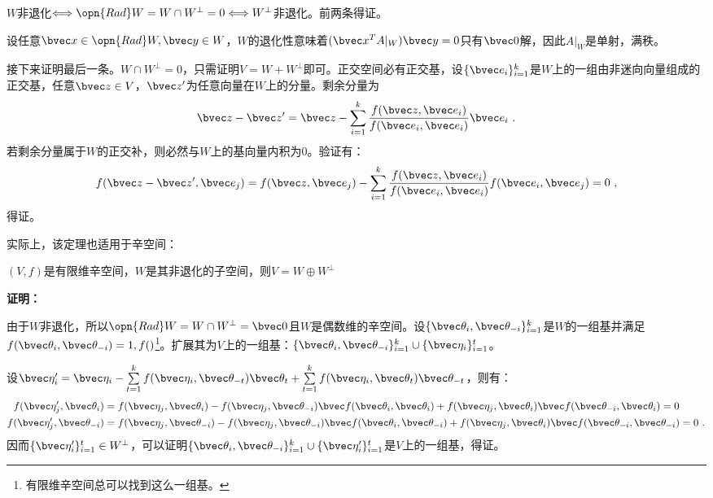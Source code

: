 $W$非退化$\Longleftrightarrow \opn{Rad}W=W\cap W^{\bot}=0\Longleftrightarrow  W^{\bot}$非退化。前两条得证。

设任意$\bvec x\in \opn{Rad} W,\bvec y\in W$，$W$的退化性意味着$(\bvec x^{T}A|_{W})\bvec  y=0$只有$\bvec 0$解，因此$A|_{W}$是单射，满秩。

接下来证明最后一条。$W\cap W^{\bot}=0$，只需证明$V=W+W^{\bot}$即可。正交空间必有正交基，设$\{\bvec e_i\}_{i=1}^k$是$W$上的一组由非迷向向量组成的正交基，任意$\bvec z\in V$，$\bvec z'$为任意向量在$W$上的分量。剩余分量为
\begin{equation}
\bvec z-\bvec z'=\bvec z-\sum\limits_{i=1}^k\frac{f(\bvec z,\bvec e_i)}{f(\bvec e_i,\bvec e_i)}\bvec e_i~.
\end{equation}
若剩余分量属于$W$的正交补，则必然与$W$上的基向量内积为$0$。验证有：
\begin{equation}
f(\bvec z-\bvec z',\bvec e_j)=f(\bvec z,\bvec e_j)-\sum\limits_{i=1}^k\frac{f(\bvec z,\bvec e_i)}{f(\bvec e_i,\bvec e_i)}f(\bvec e_i,\bvec e_j)=0~,
\end{equation}
得证。

实际上，该定理也适用于辛空间：
\begin{theorem}{}
$(V,f)$是有限维辛空间，$W$是其非退化的子空间，则$V=W\oplus W^{\bot}$
\end{theorem}
\textbf{证明：}

由于$W$非退化，所以$\opn{Rad} W=W\cap W^{\bot}={\bvec 0}$且$W$是偶数维的辛空间。设$\{\bvec \theta_i,\bvec \theta_{-i}\}_{i=1}^k$是$W$的一组基并满足$f(\bvec \theta_i,\bvec\theta_{-i})=1,f()$\footnote{有限维辛空间总可以找到这么一组基。}。扩展其为$V$上的一组基：$\{\bvec \theta_i,\bvec \theta_{-i}\}_{i=1}^k\cup\{\bvec \eta_i\}_{i=1}^{t}$。

设$\bvec \eta'_i=\bvec\eta_i-\sum\limits_{t=1}^kf(\bvec \eta_i,\bvec \theta_{-t})\bvec\theta_t+\sum\limits_{t=1}^kf(\bvec\eta_i,\bvec\theta_t)\bvec\theta_{-t}$，则有：
\begin{equation}
\begin{aligned}
f(\bvec \eta'_j,\bvec  \theta_i)&=f(\bvec \eta_j,\bvec  \theta_i)-f(\bvec\eta_j,\bvec  \theta_{-i})\bvec f(\bvec \theta_i,\bvec \theta_i)+f(\bvec\eta_j,\bvec \theta_i)\bvec f(\bvec \theta_{-i},\bvec \theta_{i})=0\\
f(\bvec \eta'_j,\bvec  \theta_{-i})&=f(\bvec \eta_j,\bvec  \theta_{-i})-f(\bvec\eta_j,\bvec  \theta_{-i})\bvec f(\bvec \theta_i,\bvec \theta_{-i})+f(\bvec\eta_j,\bvec \theta_i)\bvec f(\bvec \theta_{-i},\bvec \theta_{-i})=0~.
\end{aligned}
\end{equation}
因而$\{\bvec \eta'_i\}_{i=1}^t\in W^{\bot}$，可以证明$\{\bvec \theta_i,\bvec \theta_{-i}\}_{i=1}^k\cup\{\bvec \eta'_i\}_{i=1}^t$是$V$上的一组基，得证。